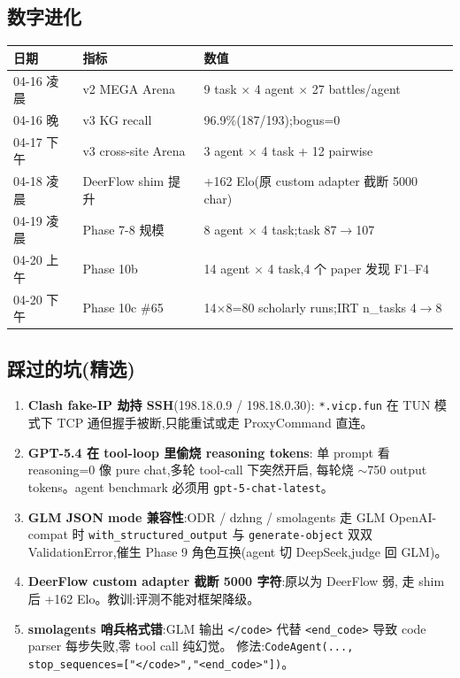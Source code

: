 \documentclass[UTF8,11pt]{ctexart}
\begin{document}
\subsection{数字进化}

\begin{center}
\small
\begin{tabular}{@{}p{2.5cm}p{4.0cm}p{6.0cm}@{}}
\toprule
\textbf{日期} & \textbf{指标} & \textbf{数值} \\
\midrule
04-16 凌晨 & v2 MEGA Arena & 9 task $\times$ 4 agent $\times$ 27 battles/agent \\
04-16 晚 & v3 KG recall & 96.9\%(187/193);bogus=0 \\
04-17 下午 & v3 cross-site Arena & 3 agent $\times$ 4 task + 12 pairwise \\
04-18 凌晨 & DeerFlow shim 提升 & +162 Elo(原 custom adapter 截断 5000 char)\\
04-19 凌晨 & Phase 7-8 规模 & 8 agent $\times$ 4 task;task 87$\to$107 \\
04-20 上午 & Phase 10b & 14 agent $\times$ 4 task,4 个 paper 发现 F1--F4 \\
04-20 下午 & Phase 10c \#65 & 14$\times$8=80 scholarly runs;IRT n\_tasks 4$\to$8 \\
\bottomrule
\end{tabular}
\end{center}

\subsection{踩过的坑(精选)}

\begin{enumerate}[leftmargin=2em, labelsep=0.5em]
\item \textbf{Clash fake-IP 劫持 SSH}(198.18.0.9 / 198.18.0.30):
  \texttt{*.vicp.fun} 在 TUN 模式下 TCP 通但握手被断,只能重试或走 ProxyCommand 直连。
\item \textbf{GPT-5.4 在 tool-loop 里偷烧 reasoning tokens}:
  单 prompt 看 reasoning=0 像 pure chat,多轮 tool-call 下突然开启,
  每轮烧 $\sim$750 output tokens。agent benchmark 必须用 \texttt{gpt-5-chat-latest}。
\item \textbf{GLM JSON mode 兼容性}:ODR / dzhng / smolagents 走 GLM OpenAI-compat
  时 \texttt{with\_structured\_output} 与 \texttt{generate-object}
  双双 ValidationError,催生 Phase 9 角色互换(agent 切 DeepSeek,judge 回 GLM)。
\item \textbf{DeerFlow custom adapter 截断 5000 字符}:原以为 DeerFlow 弱,
  走 shim 后 +162 Elo。教训:评测不能对框架降级。
\item \textbf{smolagents 哨兵格式错}:GLM 输出 \texttt{</code>} 代替
  \texttt{<end\_code>} 导致 code parser 每步失败,零 tool call 纯幻觉。
  修法:\texttt{CodeAgent(..., stop\_sequences=["</code>",\allowbreak{}"<end\_code>"])}。
\end{enumerate}
\end{document}
